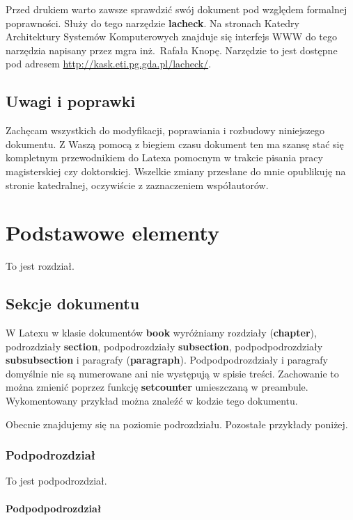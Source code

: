 \documentclass[twoside,a4paper]{book}
\begin{document}
Przed drukiem warto zawsze sprawdzić swój dokument pod względem formalnej poprawności. Służy do tego narzędzie \textbf{lacheck}. Na stronach Katedry Architektury Systemów Komputerowych znajduje się interfejs WWW do tego narzędzia napisany przez mgra inż.\ Rafała Knopę. Narzędzie to jest dostępne pod adresem \url{http://kask.eti.pg.gda.pl/lacheck/}.

\section{Uwagi i poprawki}

Zachęcam wszystkich do modyfikacji, poprawiania i rozbudowy niniejszego dokumentu. Z Waszą pomocą z biegiem czasu dokument ten ma szansę stać się kompletnym przewodnikiem do Latexa pomocnym w trakcie pisania pracy magisterskiej czy doktorskiej. Wszelkie zmiany przesłane do mnie opublikuję na stronie katedralnej, oczywiście z zaznaczeniem współautorów.

\chapter{Podstawowe elementy}

To jest rozdział.

\section{Sekcje dokumentu}

W Latexu w klasie dokumentów \textbf{book} wyróżniamy rozdziały (\textbf{chapter}), podrozdziały \textbf{section}, podpodrozdziały \textbf{subsection}, podpodpodrozdziały \textbf{subsubsection} i paragrafy (\textbf{paragraph}). Podpodpodrozdziały i paragrafy domyślnie nie są numerowane ani nie występują w spisie treści. Zachowanie to można zmienić poprzez funkcję \textbf{setcounter} umieszczaną w preambule. Wykomentowany przykład można znaleźć w kodzie tego dokumentu.

Obecnie znajdujemy się na poziomie podrozdziału. Pozostałe przykłady poniżej.

\subsection{Podpodrozdział}

To jest podpodrozdział.

\subsubsection{Podpodpodrozdział}
\end{document}
